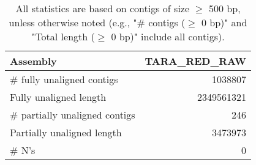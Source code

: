 \documentclass[12pt,a4paper]{article}
\begin{document}
\begin{table}[ht]
\begin{center}
\caption{All statistics are based on contigs of size $\geq$ 500 bp, unless otherwise noted (e.g., "\# contigs ($\geq$ 0 bp)" and "Total length ($\geq$ 0 bp)" include all contigs).}
\begin{tabular}{|l*{1}{|r}|}
\hline
Assembly & TARA\_RED\_RAW \\ \hline
\# fully unaligned contigs & 1038807 \\ \hline
Fully unaligned length & 2349561321 \\ \hline
\# partially unaligned contigs & 246 \\ \hline
Partially unaligned length & 3473973 \\ \hline
\# N's & 0 \\ \hline
\end{tabular}
\end{center}
\end{table}
\end{document}
